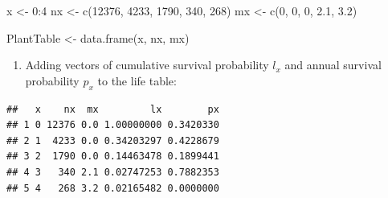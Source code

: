 \documentclass[
]{book}
\newenvironment{Shaded}{\begin{snugshade}}{\end{snugshade}}
\newcommand{\CommentTok}[1]{\textcolor[rgb]{0.56,0.35,0.01}{\textit{#1}}}
\newcommand{\DecValTok}[1]{\textcolor[rgb]{0.00,0.00,0.81}{#1}}
\newcommand{\FloatTok}[1]{\textcolor[rgb]{0.00,0.00,0.81}{#1}}
\newcommand{\FunctionTok}[1]{\textcolor[rgb]{0.00,0.00,0.00}{#1}}
\newcommand{\NormalTok}[1]{#1}
\newcommand{\OtherTok}[1]{\textcolor[rgb]{0.56,0.35,0.01}{#1}}
\newcommand{\SpecialCharTok}[1]{\textcolor[rgb]{0.00,0.00,0.00}{#1}}
\providecommand{\tightlist}{%
  \setlength{\itemsep}{0pt}\setlength{\parskip}{0pt}}
\begin{document}
\begin{Shaded}
\begin{Highlighting}[]
\NormalTok{x }\OtherTok{\textless{}{-}} \DecValTok{0}\SpecialCharTok{:}\DecValTok{4} 
\NormalTok{nx }\OtherTok{\textless{}{-}} \FunctionTok{c}\NormalTok{(}\DecValTok{12376}\NormalTok{, }\DecValTok{4233}\NormalTok{, }\DecValTok{1790}\NormalTok{, }\DecValTok{340}\NormalTok{, }\DecValTok{268}\NormalTok{)}
\NormalTok{mx }\OtherTok{\textless{}{-}} \FunctionTok{c}\NormalTok{(}\DecValTok{0}\NormalTok{, }\DecValTok{0}\NormalTok{, }\DecValTok{0}\NormalTok{, }\FloatTok{2.1}\NormalTok{, }\FloatTok{3.2}\NormalTok{)}
 
\NormalTok{PlantTable }\OtherTok{\textless{}{-}} \FunctionTok{data.frame}\NormalTok{(x, nx, mx) }
\end{Highlighting}
\end{Shaded}

\begin{enumerate}
\def\labelenumi{\arabic{enumi}.}
\setcounter{enumi}{2}
\tightlist
\item
  Adding vectors of cumulative survival probability \(l_x\) and annual survival probability \(p_x\) to the life table:
\end{enumerate}

\begin{Shaded}
\end{Shaded}

\begin{verbatim}
##   x    nx  mx         lx        px
## 1 0 12376 0.0 1.00000000 0.3420330
## 2 1  4233 0.0 0.34203297 0.4228679
## 3 2  1790 0.0 0.14463478 0.1899441
## 4 3   340 2.1 0.02747253 0.7882353
## 5 4   268 3.2 0.02165482 0.0000000
\end{verbatim}
\end{document}
